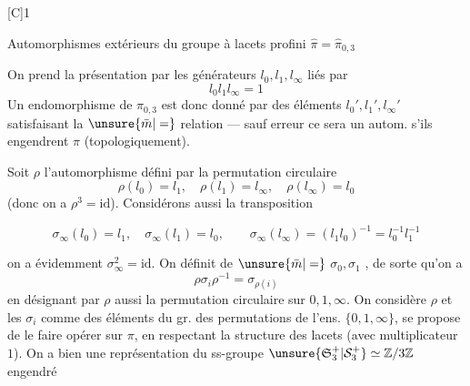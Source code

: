 [C]\qquad\textcircled{1}\qquad{}

Automorphismes extérieurs du groupe à lacets profini $\hat\pi=\hat\pi_{0,3}$
\margin{\unsure{$\partial$}}

On prend la présentation par les générateurs $l_0,l_1,l_\infty$ liés par
\[
l_0l_1l_\infty=1
\]
Un endomorphisme de $\pi_{0,3}$ est donc donné par des éléments $l_0',l_1',l_\infty'$ satisfaisant la $\unsure{\bar m|=}$ relation --- sauf erreur ce sera un autom. s'ils engendrent $\pi$ (topologiquement).

Soit $\rho$ l'automorphisme défini par la permutation circulaire
\[
\rho(l_0)=l_1,\quad\rho(l_1)=l_\infty,\quad\rho(l_\infty)=l_0
\]
(donc on a $\rho^3=\mathrm{id}$). Considérons aussi la transposition

\[
\sigma_\infty(l_0)=l_1,\quad\sigma_\infty(l_1)=l_0,\qquad
\sigma_\infty(l_\infty)=(l_1l_0)^{-1}=l_0^{-1}l_1^{-1}
\]

on a évidemment $\sigma_\infty^2=\mathrm{id}$. On définit de $\unsure{\bar m|=}$ $\sigma_0,\sigma_1$ , de sorte qu'on a
\[
\rho\sigma_i\rho^{-1}=\sigma_{\rho(i)}
\]
en désignant par $\rho$ aussi la permutation circulaire sur $0,1,\infty$. On considère $\rho$ et les $\sigma_i$ comme des éléments du gr.  des permutations de l'ens. $\{0,1,\infty\}$,  se propose de le faire opérer sur $\pi$, en respectant la structure des lacets (avec  multiplicateur $1$). On a bien une  représentation du ss-groupe $\unsure{\mathfrak S_3^+|\mathcal S_3^+}\simeq\mathbb Z/3\mathbb Z$ engendré
